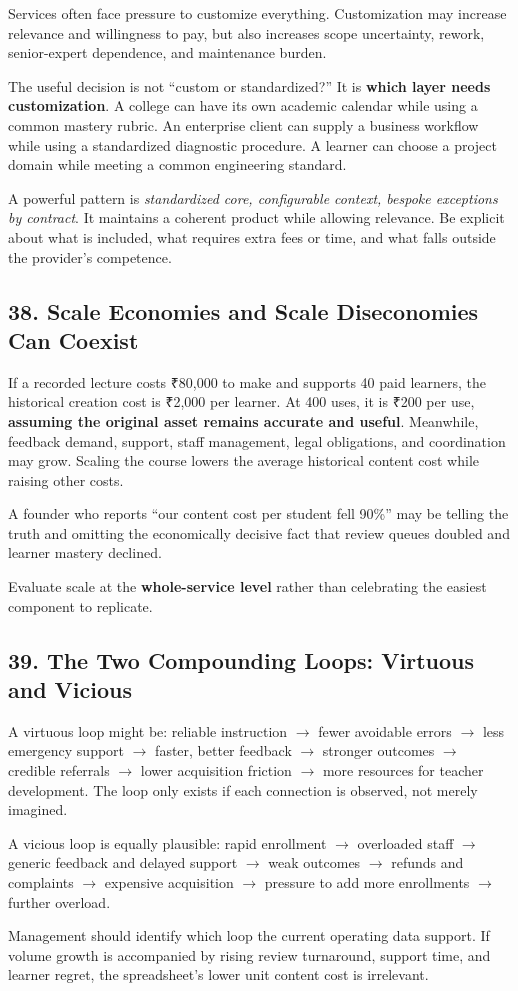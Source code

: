 Services often face pressure to customize everything. Customization may increase relevance and willingness to pay, but also increases scope uncertainty, rework, senior-expert dependence, and maintenance burden.

The useful decision is not ``custom or standardized?'' It is \textbf{which layer needs customization}. A college can have its own academic calendar while using a common mastery rubric. An enterprise client can supply a business workflow while using a standardized diagnostic procedure. A learner can choose a project domain while meeting a common engineering standard.

A powerful pattern is \emph{standardized core, configurable context, bespoke exceptions by contract}. It maintains a coherent product while allowing relevance. Be explicit about what is included, what requires extra fees or time, and what falls outside the provider's competence.

\subsection*{38. Scale Economies and Scale Diseconomies Can Coexist}

If a recorded lecture costs ₹80,000 to make and supports 40 paid learners, the historical creation cost is ₹2,000 per learner. At 400 uses, it is ₹200 per use, \textbf{assuming the original asset remains accurate and useful}. Meanwhile, feedback demand, support, staff management, legal obligations, and coordination may grow. Scaling the course lowers the average historical content cost while raising other costs.

A founder who reports ``our content cost per student fell 90\%'' may be telling the truth and omitting the economically decisive fact that review queues doubled and learner mastery declined.

Evaluate scale at the \textbf{whole-service level} rather than celebrating the easiest component to replicate.

\subsection*{39. The Two Compounding Loops: Virtuous and Vicious}

A virtuous loop might be: reliable instruction $\rightarrow$ fewer avoidable errors $\rightarrow$ less emergency support $\rightarrow$ faster, better feedback $\rightarrow$ stronger outcomes $\rightarrow$ credible referrals $\rightarrow$ lower acquisition friction $\rightarrow$ more resources for teacher development. The loop only exists if each connection is observed, not merely imagined.

A vicious loop is equally plausible: rapid enrollment $\rightarrow$ overloaded staff $\rightarrow$ generic feedback and delayed support $\rightarrow$ weak outcomes $\rightarrow$ refunds and complaints $\rightarrow$ expensive acquisition $\rightarrow$ pressure to add more enrollments $\rightarrow$ further overload.

Management should identify which loop the current operating data support. If volume growth is accompanied by rising review turnaround, support time, and learner regret, the spreadsheet's lower unit content cost is irrelevant.
